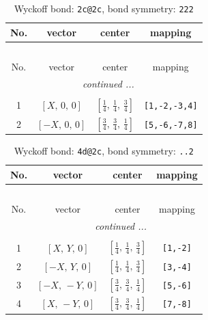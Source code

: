 \documentclass[fleqn,8pt]{jsarticle}
\begin{document}
\begin{longtable}{cccc}
\caption{Wyckoff bond: {\tt 2c@2c}, bond symmetry: {\tt 222}}
 \\
 \hline \hline
No. & vector & center & mapping \\ \hline \endfirsthead

\multicolumn{3}{l}{\tablename\ \thetable{}} \\
 \hline \hline
No. & vector & center & mapping \\ \hline \endhead

 \hline \hline
\multicolumn{3}{r}{\footnotesize\it continued ...} \\ \endfoot

 \hline \hline
\multicolumn{3}{r}{} \\ \endlastfoot

1 & $\left[ X,\, 0,\, 0 \right]$ & $\left[ \frac{1}{4},\, \frac{1}{4},\, \frac{3}{4} \right]$ & {\tt [1,-2,-3,4]} \\ \hline
2 & $\left[ - X,\, 0,\, 0 \right]$ & $\left[ \frac{3}{4},\, \frac{3}{4},\, \frac{1}{4} \right]$ & {\tt [5,-6,-7,8]} \\
\end{longtable}
\renewcommand{\arraystretch}{1.2}
\begin{longtable}{cccc}
\caption{Wyckoff bond: {\tt 4d@2c}, bond symmetry: {\tt ..2}}
 \\
 \hline \hline
No. & vector & center & mapping \\ \hline \endfirsthead

\multicolumn{3}{l}{\tablename\ \thetable{}} \\
 \hline \hline
No. & vector & center & mapping \\ \hline \endhead

 \hline \hline
\multicolumn{3}{r}{\footnotesize\it continued ...} \\ \endfoot

 \hline \hline
\multicolumn{3}{r}{} \\ \endlastfoot

1 & $\left[ X,\, Y,\, 0 \right]$ & $\left[ \frac{1}{4},\, \frac{1}{4},\, \frac{3}{4} \right]$ & {\tt [1,-2]} \\ \hline
2 & $\left[ - X,\, Y,\, 0 \right]$ & $\left[ \frac{1}{4},\, \frac{1}{4},\, \frac{3}{4} \right]$ & {\tt [3,-4]} \\ \hline
3 & $\left[ - X,\, - Y,\, 0 \right]$ & $\left[ \frac{3}{4},\, \frac{3}{4},\, \frac{1}{4} \right]$ & {\tt [5,-6]} \\ \hline
4 & $\left[ X,\, - Y,\, 0 \right]$ & $\left[ \frac{3}{4},\, \frac{3}{4},\, \frac{1}{4} \right]$ & {\tt [7,-8]} \\
\end{longtable}
\end{document}
